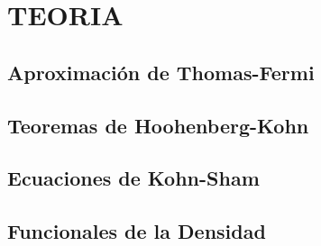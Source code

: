 \chapter{TEORIA}

 



\section{Aproximación de Thomas-Fermi}

\section{Teoremas de Hoohenberg-Kohn}   

\section{Ecuaciones de Kohn-Sham}

\section{Funcionales de la Densidad}

